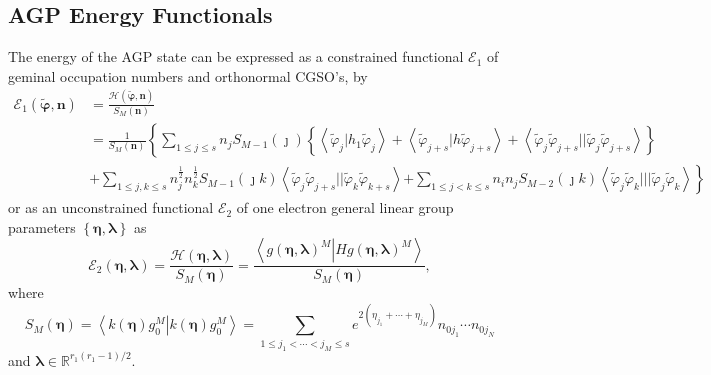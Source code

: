 \documentclass[aps,preprint]{revtex4}%
\begin{document}
\subsection{AGP Energy Functionals}

The energy of the AGP state can be expressed as a constrained functional
$\mathcal{E}_{1}$ of geminal occupation numbers and orthonormal CGSO's, by
\emph{ }
\begin{align}
\mathcal{E}_{1}\left(  \boldsymbol{\tilde{\varphi},n}\right)   &
=\frac{\mathcal{H}\left(  \boldsymbol{\tilde{\varphi},n}\right)  }%
{S_{M}\left(  \boldsymbol{n}\right)  }\nonumber\\
&  =\frac{1}{S_{M}\left(  \boldsymbol{n}\right)  }\left\{  \sum_{1\leq j\leq
s}n_{j}S_{M-1}\left(  \jmath\right)  \left\{  \left\langle \tilde{\varphi}%
_{j}\left\vert h_{1}\right.  \tilde{\varphi}_{j}\right\rangle +\left\langle
\tilde{\varphi}_{j+s}\left\vert h\right.  \tilde{\varphi}_{j+s}\right\rangle
+\left\langle \tilde{\varphi}_{j}\tilde{\varphi}_{j+s}||\tilde{\varphi}%
_{j}\tilde{\varphi}_{j+s}\right\rangle \right\}  \right. \nonumber\\
&  +\sum_{1\leq j,k\leq s}n_{j}^{\frac{1}{2}}n_{k}^{\frac{1}{2}}S_{M-1}\left(
\jmath k\right)  \left\langle \tilde{\varphi}_{j}\tilde{\varphi}_{j+s}%
||\tilde{\varphi}_{k}\tilde{\varphi}_{k+s}\right\rangle \left.  +\sum_{1\leq
j<k\leq s}n_{i}n_{j}S_{M-2}\left(  \jmath k\right)  \left\langle
\tilde{\varphi}_{j}\tilde{\varphi}_{k}|||\tilde{\varphi}_{j}\tilde{\varphi
}_{k}\right\rangle \right\}  \label{energy}%
\end{align}
or as an unconstrained functional $\mathcal{E}_{2}$ of one electron general
linear group parameters $\left\{  \boldsymbol{\eta},\boldsymbol{\lambda
}\right\}  $ as
\begin{equation}
\mathcal{E}_{2}\left(  \boldsymbol{\eta},\boldsymbol{\lambda}\right)
=\frac{\mathcal{H}\left(  \boldsymbol{\eta},\boldsymbol{\lambda}\right)
}{S_{M}\left(  \boldsymbol{\eta}\right)  }=\frac{\left\langle \left.  g\left(
\boldsymbol{\eta},\boldsymbol{\lambda}\right)  ^{M}\right\vert Hg\left(
\boldsymbol{\eta},\boldsymbol{\lambda}\right)  ^{M}\right\rangle }%
{S_{M}\left(  \boldsymbol{\eta}\right)  }, \label{gp_funct}%
\end{equation}
where%
\begin{equation}
S_{M}\left(  \boldsymbol{\eta}\right)  =\left\langle \left.  k\left(
\boldsymbol{\eta}\right)  g_{0}^{M}\right\vert k\left(  \boldsymbol{\eta
}\right)  g_{0}^{M}\right\rangle =\sum_{1\leq j_{1}<\cdots<j_{M}\leq
s}e^{2\left(  \eta_{j_{1}}+\cdots+\eta_{j_{M}}\right)  }n_{0j_{1}}\cdots
n_{0j_{N}}%
\end{equation}
and $\boldsymbol{\lambda\in}\mathbb{R}^{r_{1}\left(  r_{1}-1\right)  /2}.$
\end{document}
